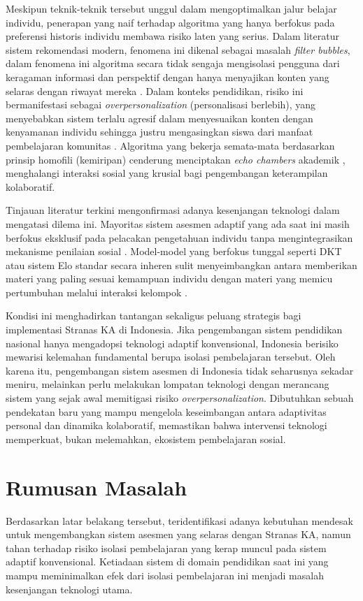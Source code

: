 Meskipun teknik-teknik tersebut unggul dalam mengoptimalkan jalur
belajar individu, penerapan yang naif terhadap algoritma yang hanya berfokus
pada preferensi historis individu membawa risiko laten yang serius. Dalam
literatur sistem rekomendasi modern, fenomena ini dikenal sebagai masalah
\textit{filter bubbles}, dalam fenomena ini algoritma secara tidak sengaja
mengisolasi
pengguna dari keragaman informasi dan perspektif dengan hanya menyajikan konten
yang selaras dengan riwayat mereka \autocite{Wang2022}. Dalam konteks pendidikan,
risiko ini bermanifestasi sebagai \textit{overpersonalization} (personalisasi
berlebih), yang menyebabkan sistem terlalu agresif dalam menyesuaikan konten dengan
kenyamanan individu sehingga justru mengasingkan siswa dari manfaat pembelajaran komunitas
\autocite{Halkiopoulos2024}. Algoritma yang bekerja semata-mata berdasarkan
prinsip homofili (kemiripan) cenderung menciptakan \textit{echo chambers}
akademik \autocite{Tommasel2021}, menghalangi interaksi sosial yang krusial bagi
pengembangan keterampilan kolaboratif.

Tinjauan literatur terkini mengonfirmasi adanya kesenjangan teknologi dalam
mengatasi dilema ini. Mayoritas sistem asesmen adaptif yang ada saat ini masih
berfokus eksklusif pada pelacakan pengetahuan individu tanpa mengintegrasikan
mekanisme penilaian sosial \autocite{Ihichr2024}. Model-model yang berfokus
tunggal seperti DKT atau sistem Elo standar secara inheren sulit menyeimbangkan
antara memberikan materi yang paling sesuai kemampuan individu dengan materi
yang memicu pertumbuhan melalui interaksi kelompok \autocite{Dokoupil2022}.

Kondisi ini menghadirkan tantangan sekaligus peluang strategis bagi implementasi
Stranas KA di Indonesia. Jika pengembangan sistem pendidikan nasional hanya
mengadopsi teknologi adaptif konvensional, Indonesia berisiko mewarisi kelemahan
fundamental berupa isolasi pembelajaran tersebut. Oleh karena itu, pengembangan
sistem asesmen di Indonesia tidak seharusnya sekadar meniru, melainkan perlu
melakukan lompatan teknologi dengan merancang sistem yang sejak awal memitigasi
risiko \textit{overpersonalization}. Dibutuhkan sebuah pendekatan baru yang
mampu mengelola keseimbangan antara adaptivitas personal dan dinamika kolaboratif,
memastikan bahwa intervensi teknologi memperkuat, bukan melemahkan, ekosistem
pembelajaran sosial.

\section{Rumusan Masalah}
\label{sec:rumusan_masalah}
Berdasarkan latar belakang tersebut, teridentifikasi adanya kebutuhan mendesak
untuk mengembangkan sistem asesmen yang selaras dengan Stranas KA, namun tahan
terhadap risiko isolasi pembelajaran yang kerap muncul pada sistem adaptif
konvensional. Ketiadaan sistem di domain pendidikan saat ini 
yang mampu meminimalkan efek dari isolasi pembelajaran ini menjadi
masalah kesenjangan teknologi utama.

